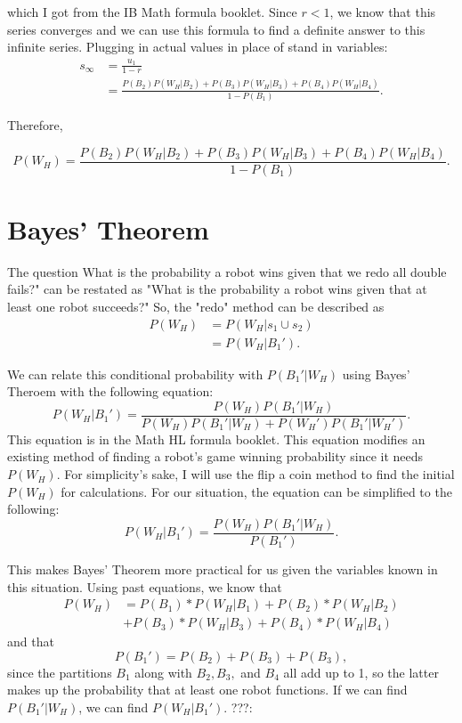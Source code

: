 \documentclass[11pt]{article}
\begin{document}
which I got from the IB Math formula booklet. Since \(r < 1 \), we know that this
series converges and we can use this formula to find a definite answer to this infinite series.
Plugging in actual values in place of stand in variables:
\begin{align*}
    s_{\infty} &= \frac{u_1}{1-r}\\
    &= \frac{P(B_2)P(W_H | B_2) + P(B_3)P(W_H | B_3) + P(B_4)P(W_H | B_4)}{1-P(B_1)}.
\end{align*}

Therefore,

\begin{equation*}
    P(W_{H}) = \frac{P(B_2)P(W_H | B_2) + P(B_3)P(W_H | B_3) + P(B_4)P(W_H | B_4)}{1-P(B_1)}.
\end{equation*}

\section{Bayes' Theorem}
The question What is the probability a robot wins given that we redo all double fails?" can be restated as
"What is the probability a robot wins given that at least one robot succeeds?" So, the "redo" method can be
described as 
\begin{align*}
    P(W_H) &= P(W_H | s_1 \cup s_2)\\
    &= P(W_H | B_1').
\end{align*}

We can relate this conditional probability with \(P(B_1' | W_H) \) using Bayes' Theroem with the following
equation:
\begin{equation*}
    P(W_H | B_1') = \frac{P(W_H) P(B_1' | W_H)}{P(W_H) P(B_1' | W_H) + P(W_H') P(B_1' | W_H')}.
\end{equation*}
This equation is in the Math HL formula booklet. This equation modifies an existing method of finding
a robot's game winning probability since it needs \(P(W_H)\). For simplicity's sake, I will use the flip
a coin method to find the initial \(P(W_H)\) for calculations. For our situation, the equation can be 
simplified to the following:
\begin{equation*}
    P(W_H | B_1') = \frac{P(W_H) P(B_1' | W_H)}{P(B_1')}.
\end{equation*}

This makes  Bayes' Theorem more practical for us given the variables known in this situation. Using past 
equations, we know that
\begin{align*}
    P(W_H) &=  P(B_{1}) * P(W_{H} | B_{1}) + P(B_{2}) * P(W_{H} | B_{2}) \\
    &+ P(B_{3}) * P(W_{H} | B_{3}) + P(B_{4}) * P(W_{H} | B_{4})
\end{align*}
and that
\begin{equation*}
    P(B_1') = P(B_2) + P(B_3) + P(B_3),
\end{equation*}
since the partitions \(B_1\) along with \(B_2, B_3,\) and \(B_4\) all add up to 1, so the latter makes up the probability that at least
one robot functions. If we can find \(P(B_1' | W_H)\), we can find \(P(W_H | B_1')\). ???:
\end{document}
